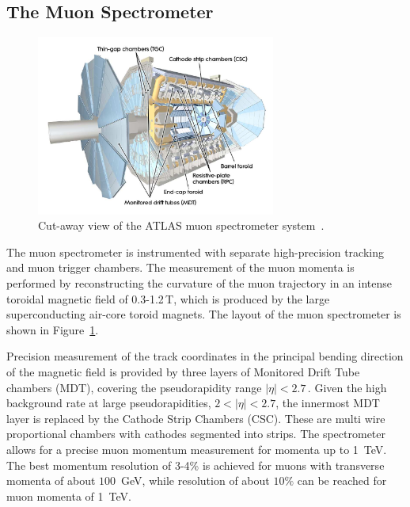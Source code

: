 \subsection{The Muon Spectrometer}
\begin{figure}[tp]
     \begin{center}

            \includegraphics[width=0.7\textwidth]{figure/muonSpec.png}

    \end{center}
    \caption{Cut-away view of the ATLAS muon spectrometer system~\cite{ATLASDetector}.}



   \label{fig:atlasMu}
\end{figure}
The muon spectrometer is instrumented with separate high-precision tracking and muon trigger chambers. The measurement of the 
muon momenta is performed by reconstructing the  curvature of the muon trajectory in an intense toroidal magnetic field 
of 0.3-1.2\,T, which is  produced by the large superconducting air-core toroid magnets.
The layout of the muon spectrometer is shown in Figure~\ref{fig:atlasMu}.

Precision measurement of the track coordinates in the principal bending direction of the 
magnetic field is provided by three layers of Monitored Drift Tube chambers (MDT), covering the pseudorapidity range
 $|\eta| < 2.7\,.$ Given the high background rate at large pseudorapidities, 
$2 < |\eta| < 2.7$, the innermost MDT layer is replaced by the Cathode Strip Chambers (CSC). These are multi wire
proportional chambers with cathodes segmented into strips. 
The spectrometer allows for a precise muon momentum measurement for momenta up to 1~TeV.
The best momentum resolution of 3-4\% is achieved for muons with transverse momenta of about $100$~GeV, while resolution of 
about $10\%$ can be reached for muon momenta of 1~TeV. 

